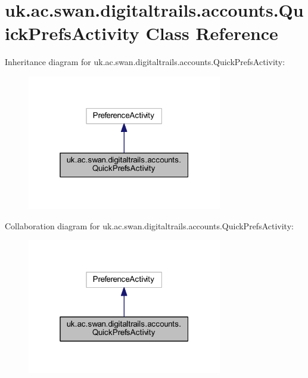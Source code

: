\hypertarget{classuk_1_1ac_1_1swan_1_1digitaltrails_1_1accounts_1_1_quick_prefs_activity}{\section{uk.\+ac.\+swan.\+digitaltrails.\+accounts.\+Quick\+Prefs\+Activity Class Reference}
\label{classuk_1_1ac_1_1swan_1_1digitaltrails_1_1accounts_1_1_quick_prefs_activity}
}


Inheritance diagram for uk.\+ac.\+swan.\+digitaltrails.\+accounts.\+Quick\+Prefs\+Activity\+:\nopagebreak
\begin{figure}[H]
\begin{center}
\leavevmode
\includegraphics[width=241pt]{classuk_1_1ac_1_1swan_1_1digitaltrails_1_1accounts_1_1_quick_prefs_activity__inherit__graph}
\end{center}
\end{figure}


Collaboration diagram for uk.\+ac.\+swan.\+digitaltrails.\+accounts.\+Quick\+Prefs\+Activity\+:\nopagebreak
\begin{figure}[H]
\begin{center}
\leavevmode
\includegraphics[width=241pt]{classuk_1_1ac_1_1swan_1_1digitaltrails_1_1accounts_1_1_quick_prefs_activity__coll__graph}
\end{center}
\end{figure}

